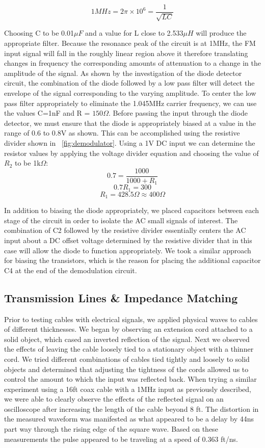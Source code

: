\documentclass[11pt]{article}
\begin{document}
  $$1MHz = 2\pi \times 10^6 = \frac{1}{\sqrt{LC}}$$
  
  Choosing C to be 0.01$\mu F$ and a value for L close to 2.533$\mu H$ will produce the appropriate filter. Because the resonance peak of the circuit is at 1MHz, the FM input signal will fall in the roughly linear region above it therefore translating changes in frequency the corresponding amounts of attenuation to a change in the amplitude of the signal.  As shown by the investigation of the diode detector circuit, the combination of the diode followed by a low pass filter will detect the envelope of the signal corresponding to the varying amplitude. To center the low pass filter appropriately to eliminate the 1.045MHz carrier frequency, we can use the values C=1nF and R = $150\Omega$.
  Before passing the input through the diode detector, we must ensure that the diode is appropriately biased at a value in the range of 0.6 to 0.8V as shown.  This can be accomplished using the resistive divider shown in ~\ref{fig:demodulator}.  Using a 1V DC input we can determine the resistor values by applying the voltage divider equation and choosing the value of $R_2$ to be 1k$\Omega$:
  $$0.7 = \frac{1000}{1000 + R_1}$$
  $$0.7R_1 = 300$$ 
  $$R_1 = 428.5\Omega \approx 400\Omega$$
  
  In addition to biasing the diode appropriately, we placed capacitors between each stage of the circuit in order to isolate the AC small signals of interest.  The combination of C2 followed by the resistive divider essentially centers the AC input about a DC offset voltage determined by the resistive divider that in this case will allow the diode to function appropriately.  We took a similar approach for biasing the transistors, which is the reason for placing the additional capacitor C4 at the end of the demodulation circuit.
  
  \subsection{Transmission Lines \& Impedance Matching}
  Prior to testing cables with electrical signals, we applied physical waves to cables of different thicknesses. We began by observing an extension cord attached to a solid object, which cased an inverted reflection of the signal.  Next we observed the effects of leaving the cable loosely tied to a stationary object with a thinner cord.  We tried different combinations of cables tied tightly and loosely to solid objects and determined that adjusting the tightness of the cords allowed us to control the amount to which the input was reflected back.
  When trying a similar experiment using a 16ft coax cable with a 1MHz input as previously described, we were able to clearly observe the effects of the reflected signal on an oscilloscope after increasing the length of the cable beyond 8 ft.  The distortion in the measured waveform was manifested as what appeared to be a delay by 44ns part way through the rising edge of the square wave.  Based on these measurements the pulse appeared to be traveling at a speed of 0.363 ft/ns.
\end{document}
